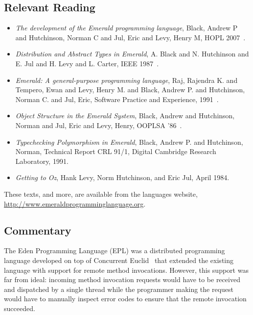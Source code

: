 \subsection{Relevant Reading}

\begin{itemize}
	\item \textit{The development of the Emerald programming language}, Black, Andrew P and Hutchinson, Norman C and Jul, Eric and Levy, Henry M, HOPL 2007~\cite{black2007development}.
	\item \textit{Distribution and Abstract Types in Emerald}, A. Black and N. Hutchinson and E. Jul and H. Levy and L. Carter, IEEE 1987~\cite{1702134}.
	\item \textit{Emerald: A general-purpose programming language}, Raj, Rajendra K. and Tempero, Ewan and Levy, Henry M. and Black, Andrew P. and Hutchinson, Norman C. and Jul, Eric, Software Practice and Experience, 1991~\cite{SPE:SPE4380210107}.
	\item \textit{Object Structure in the Emerald System}, Black, Andrew and Hutchinson, Norman and Jul, Eric and Levy, Henry, OOPLSA '86~\cite{Black:1986:OSE:28697.28706}.
	\item \textit{Typechecking Polymorphism in Emerald}, Black, Andrew P. and Hutchinson, Norman, Technical Report CRL 91/1, Digital Cambridge Research Laboratory, 1991.
	\item \textit{Getting to Oz}, Hank Levy, Norm Hutchinson, and Eric Jul, April 1984.
\end{itemize}

These texts, and more, are available from the languages website, \url{http://www.emeraldprogramminglanguage.org}.

\subsection{Commentary}

The Eden Programming Language (EPL) was a distributed programming language developed on top of Concurrent Euclid~\cite{holt1982short} that extended the existing language with support for remote method invocations.  However, this support was far from ideal: incoming method invocation requests would have to be received and dispatched by a single thread while the programmer making the request would have to manually inspect error codes to ensure that the remote invocation succeeded.

